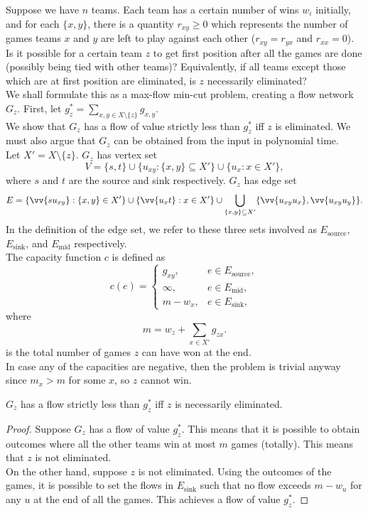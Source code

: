 Suppose we have $n$ teams. Each team has a certain number of wins $w_i$ initially, and for each $\{x,y\}$, there is a quantity $r_{xy}\geq 0$ which represents the number of games teams $x$ and $y$ are left to play against each other ($r_{xy} = r_{yx}$ and $r_{xx}=0$). Is it possible for a certain team $z$ to get first position after all the games are done (possibly being tied with other teams)? Equivalently, if all teams except those which are at first position are eliminated, is $z$ necessarily eliminated?\\

We shall formulate this as a max-flow min-cut problem, creating a flow network $G_z$. First, let $g_z^* = \sum_{x,y \in X\setminus\{z\}} g_{x,y}$.\\
We show that $G_z$ has a flow of value strictly less than $g_z^*$ iff $z$ is eliminated. We must also argue that $G_z$ can be obtained from the input in polynomial time.\\

Let $X' = X \setminus \{z\}$. $G_z$ has vertex set
\[ V = \{s,t\} \cup \{u_{xy} : \{x,y\}\subseteq X'\} \cup \{u_x : x \in X'\}, \]
where $s$ and $t$ are the source and sink respectively. $G_z$ has edge set
\[ E = \{\vv{s u_{xy}} : \{x,y\}\in X'\} \cup \{\vv{u_x t} : x \in X'\} \cup \bigcup_{\{x,y\}\subseteq X'} \{\vv{u_{xy}u_x},\vv{u_{xy}u_y}\}. \]
In the definition of the edge set, we refer to these three sets involved as $E_\text{source}$, $E_\text{sink}$, and $E_\text{mid}$ respectively.\\
The capacity function $c$ is defined as
\[
	c(e) =
	\begin{cases}
		g_{xy}, & e \in E_\text{source}, \\
		\infty, & e \in E_\text{mid}, \\
		m - w_x, & e \in E_\text{sink},
	\end{cases}
\]
where 
\[ m = w_z + \sum_{x\in X'} g_{zx}. \]
is the total number of games $z$ can have won at the end.\\
In case any of the capacities are negative, then the problem is trivial anyway since $m_x > m$ for some $x$, so $z$ cannot win.

\begin{lemma}
	$G_z$ has a flow strictly less than $g_z^*$ iff $z$ is necessarily eliminated.
\end{lemma}
\begin{proof}
	Suppose $G_z$ has a flow of value $g_z^*$. This means that it is possible to obtain outcomes where all the other teams win at most $m$ games (totally). This means that $z$ is not eliminated.\\
	On the other hand, suppose $z$ is not eliminated. Using the outcomes of the games, it is possible to set the flows in $E_\text{sink}$ such that no flow exceeds $m - w_u$ for any $u$ at the end of all the games. This achieves a flow of value $g_z^*$.
\end{proof}

